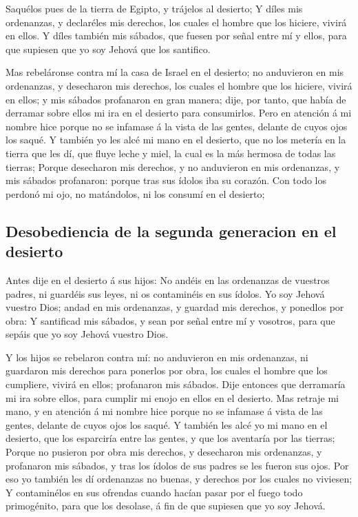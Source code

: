  Saquélos pues de la tierra de Egipto, y trájelos al
desierto;  Y díles mis ordenanzas, y declaréles mis
derechos, los cuales el hombre que los hiciere, vivirá en ellos.
 Y díles también mis sábados, que fuesen por señal entre
mí y ellos, para que supiesen que yo soy Jehová que los santifico.

 Mas rebeláronse contra mí la casa de Israel en el
desierto; no anduvieron en mis ordenanzas, y desecharon mis derechos,
los cuales el hombre que los hiciere, vivirá en ellos; y mis sábados
profanaron en gran manera; dije, por tanto, que había de derramar sobre
ellos mi ira en el desierto para consumirlos.  Pero en
atención á mi nombre hice porque no se infamase á la vista de las
gentes, delante de cuyos ojos los saqué.  Y también yo
les alcé mi mano en el desierto, que no los metería en la tierra que les
dí, que fluye leche y miel, la cual es la más hermosa de todas las
tierras;  Porque desecharon mis derechos, y no anduvieron
en mis ordenanzas, y mis sábados profanaron: porque tras sus ídolos iba
su corazón.  Con todo los perdonó mi ojo, no matándolos,
ni los consumí en el desierto;

\hypertarget{desobediencia-de-la-segunda-generacion-en-el-desierto}{%
\subsection{Desobediencia de la segunda generacion en el
desierto}\label{desobediencia-de-la-segunda-generacion-en-el-desierto}}

 Antes dije en el desierto á sus hijos: No andéis en las
ordenanzas de vuestros padres, ni guardéis sus leyes, ni os contaminéis
en sus ídolos.  Yo soy Jehová vuestro Dios; andad en mis
ordenanzas, y guardad mis derechos, y ponedlos por obra: 
Y santificad mis sábados, y sean por señal entre mí y vosotros, para que
sepáis que yo soy Jehová vuestro Dios.

 Y los hijos se rebelaron contra mí: no anduvieron en mis
ordenanzas, ni guardaron mis derechos para ponerlos por obra, los cuales
el hombre que los cumpliere, vivirá en ellos; profanaron mis sábados.
Dije entonces que derramaría mi ira sobre ellos, para cumplir mi enojo
en ellos en el desierto.  Mas retraje mi mano, y en
atención á mi nombre hice porque no se infamase á vista de las gentes,
delante de cuyos ojos los saqué.  Y también les alcé yo
mi mano en el desierto, que los esparciría entre las gentes, y que los
aventaría por las tierras;  Porque no pusieron por obra
mis derechos, y desecharon mis ordenanzas, y profanaron mis sábados, y
tras los ídolos de sus padres se les fueron sus ojos. 
Por eso yo también les dí ordenanzas no buenas, y derechos por los
cuales no viviesen;  Y contaminélos en sus ofrendas
cuando hacían pasar por el fuego todo primogénito, para que los
desolase, á fin de que supiesen que yo soy Jehová.

